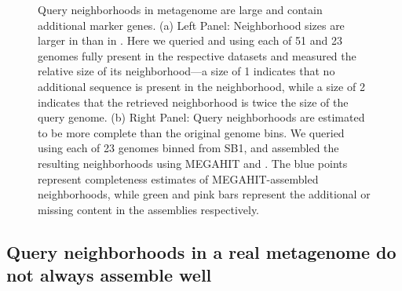 \begin{figure}[th]
	\centering
    \hspace{.05\linewidth}
	\caption{Query neighborhoods in \hu metagenome are large and contain additional marker genes.
  (a) Left Panel: Neighborhood sizes are larger in \hu than in \podarv. Here
  we queried \podarv and \hu using each of 51 and 23 genomes fully present
  in the respective datasets and measured the relative size of its neighborhood—a
  size of 1 indicates that no additional sequence is present in the neighborhood,
  while a size of 2 indicates that the retrieved neighborhood is twice the size
  of the query genome.
  (b) Right Panel: Query neighborhoods are estimated to be more complete
  than the original genome bins. We queried \hu using each of 23 genomes binned
  from SB1, and assembled the resulting neighborhoods using MEGAHIT and \plass.
  The blue points represent completeness estimates of MEGAHIT-assembled
  neighborhoods, while green and pink bars represent the additional or missing
  content in the \plass assemblies respectively.
  }\label{fig:hu_strain}
\end{figure}



\subsection*{Query neighborhoods in a real metagenome do not always assemble well}

